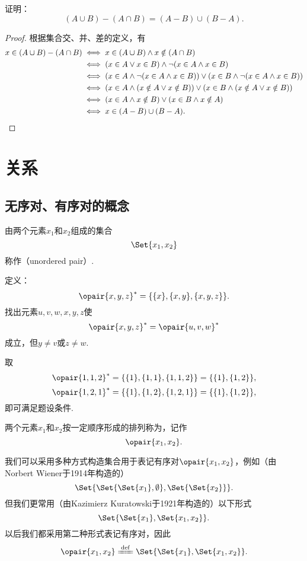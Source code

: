 \begin{example}
证明：\begin{equation}
	(A \cup B) - (A \cap B) = (A-B)\cup(B-A).
\end{equation}
\begin{proof}
根据集合交、并、差的定义，有
\begin{align*}
	x \in (A \cup B) - (A \cap B)
	&\iff x \in (A \cup B) \land x \notin (A \cap B) \\
	&\iff (x \in A \lor x \in B) \land \neg(x \in A \land x \in B) \\
	&\iff (x \in A \land \neg(x \in A \land x \in B))
	 \lor (x \in B \land \neg(x \in A \land x \in B)) \\
	&\iff (x \in A \land (x \notin A \lor x \notin B))
	 \lor (x \in B \land (x \notin A \lor x \notin B)) \\
	&\iff (x \in A \land x \notin B) \lor (x \in B \land x \notin A) \\
	&\iff x \in (A-B)\cup(B-A).
\qedhere
\end{align*}
\end{proof}
\end{example}

\section{关系}
\subsection{无序对、有序对的概念}
\begin{definition}[无序对]
由两个元素\(x_1\)和\(x_2\)组成的集合\[
\Set{x_1, x_2}
\]称作（unordered pair）.
\end{definition}

\begin{example}
定义：\[
\opair{x,y,z}^* = \{\{x\},\{x,y\},\{x,y,z\}\}.
\]找出元素\(u,v,w,x,y,z\)使\[
\opair{x,y,z}^* = \opair{u,v,w}^*
\]成立，但\(y \neq v\)或\(z \neq w\).
\begin{solution}
取\[
\opair{1,1,2}^* = \{\{1\},\{1,1\},\{1,1,2\}\} = \{\{1\},\{1,2\}\},
\]\[
\opair{1,2,1}^* = \{\{1\},\{1,2\},\{1,2,1\}\} = \{\{1\},\{1,2\}\},
\]即可满足题设条件.
\end{solution}
\end{example}

\begin{definition}[有序对]
两个元素\(x_1\)和\(x_2\)按一定顺序形成的排列称为，记作\[
\opair{x_1,x_2}.
\]

我们可以采用多种方式构造集合用于表记有序对\(\opair{x_1,x_2}\)，例如（由Norbert Wiener于1914年构造的）
\[
\Set{ \Set{ \Set{x_1}, \emptyset }, \Set{ \Set{ x_2 } } }.
\]
但我们更常用（由Kazimierz Kuratowski于1921年构造的）以下形式
\[
\Set{ \Set{x_1}, \Set{x_1, x_2} }.
\]以后我们都采用第二种形式表记有序对，因此\[
\opair{x_1,x_2}
\defeq
\Set{ \Set{x_1}, \Set{x_1, x_2} }.
\]
\end{definition}

